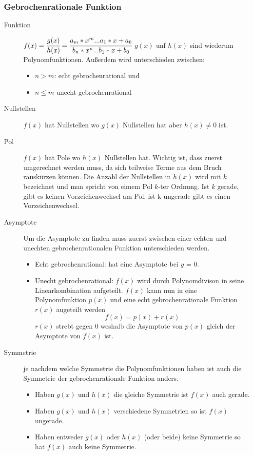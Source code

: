 \documentclass[a4paper]{scrartcl}
\begin{document}
        \subsubsection{Gebrochenrationale Funktion}
        \begin{description}
            \item[Funktion] $f(x) = \cfrac{g(x)}{h(x)}= \cfrac{a_m*x^m...a_1*x + a_0}{b_n*x^n...b_1*x + b_0}$ $g(x)$ unf $h(x)$ sind wiederum Polynomfunktionen. Außerdem wird unterschieden zwischen:
            \begin{itemize}
                \item $n > m$: echt gebrochenrational und
                \item $n \leq m$ unecht gebrochenrational
            \end{itemize}   
            \item[Nullstellen] $f(x)$ hat Nullstellen wo $g(x)$ Nullstellen hat aber $h(x) \neq 0$ ist.  
            \item[Pol] $f(x)$ hat Pole wo $h(x)$ Nullstellen hat. Wichtig ist, dass zuerst umgerechnet werden muss, da sich teilweise Terme aus dem Bruch rauskürzen können.
            Die Anzahl der Nullstellen in $h(x)$ wird mit $k$ bezeichnet und man spricht von eimem Pol $k$-ter Ordnung. Ist $k$
            gerade, gibt es keinen Vorzeichenwechsel am Pol, ist k ungerade gibt es einen Vorzeichenwechsel.
             \item[Asymptote] Um die Asymptote zu finden muss zuerst zwischen einer echten und unechten gebrochenrationalen Funktion unterschieden werden.
                \begin{itemize}
                    \item Echt gebrochenrational: hat eine Asymptote bei $y$ = 0.
                    \item Unecht gebrochenrational: $f(x)$ wird durch Polynomdivison in seine Linearkombination aufgeteilt. $f(x)$ kann nun in eine Polynomfunktion $p(x)$ und
                    eine echt gebrochenrationale Funktion $r(x)$ augeteilt werden  
                    \begin{equation*}
                        f(x) = p(x) + r(x)
                    \end{equation*}
                    $r(x)$ strebt gegen 0 weshalb die Asymptote von $p(x)$ gleich der Asymptote von $f(x)$ ist.
                \end{itemize}
             \item[Symmetrie] je nachdem welche Symmetrie die Polynomfunktionen haben ist auch die Symmetrie der gebrochenrationale Funktion anders. 
                \begin{itemize}
                    \item Haben $g(x)$ und $h(x)$ die gleiche Symmetrie ist $f(x)$ auch gerade.
                    \item Haben $g(x)$ und $h(x)$ verschiedene Symmetrien so ist $f(x)$ ungerade.
                    \item Haben entweder $g(x)$ oder $h(x)$ (oder beide) keine Symmetrie so hat $f(x)$ auch keine Symmetrie.
                \end{itemize}  
        \end{description}
\end{document}
